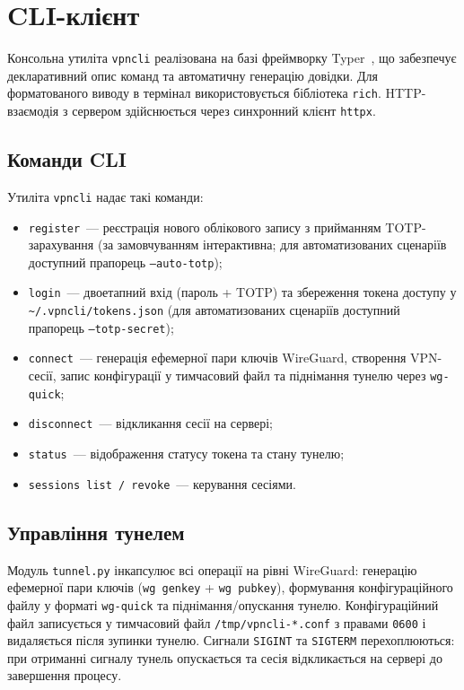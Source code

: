 \section{CLI-клієнт}
\label{sec:cli_implementation}

Консольна утиліта \texttt{vpncli} реалізована на базі фреймворку
Typer~\cite{typer2024}, що забезпечує декларативний опис команд та
автоматичну генерацію довідки. Для форматованого виводу в термінал
використовується бібліотека \texttt{rich}. HTTP-взаємодія з сервером
здійснюється через синхронний клієнт \texttt{httpx}.

\subsection{Команди CLI}

Утиліта \texttt{vpncli} надає такі команди:
\begin{itemize}
  \item \texttt{register}~--- реєстрація нового облікового запису з
        прийманням TOTP-зарахування (за замовчуванням інтерактивна;
        для автоматизованих сценаріїв доступний прапорець \texttt{--auto-totp});
  \item \texttt{login}~--- двоетапний вхід (пароль + TOTP) та збереження
        токена доступу у \texttt{\textasciitilde/.vpncli/tokens.json}
        (для автоматизованих сценаріїв доступний прапорець \texttt{--totp-secret});
  \item \texttt{connect}~--- генерація ефемерної пари ключів WireGuard,
        створення VPN-сесії, запис конфігурації у тимчасовий файл та
        піднімання тунелю через \texttt{wg-quick};
  \item \texttt{disconnect}~--- відкликання сесії на сервері;
  \item \texttt{status}~--- відображення статусу токена та стану тунелю;
  \item \texttt{sessions list / revoke}~--- керування сесіями.
\end{itemize}

\subsection{Управління тунелем}

Модуль \texttt{tunnel.py} інкапсулює всі операції на рівні WireGuard:
генерацію ефемерної пари ключів (\texttt{wg genkey} + \texttt{wg pubkey}),
формування конфігураційного файлу у форматі \texttt{wg-quick} та
піднімання/опускання тунелю. Конфігураційний файл записується у
тимчасовий файл \texttt{/tmp/vpncli-*.conf} з правами \texttt{0600}
і видаляється після зупинки тунелю. Сигнали \texttt{SIGINT} та
\texttt{SIGTERM} перехоплюються: при отриманні сигналу тунель опускається
та сесія відкликається на сервері до завершення процесу.

